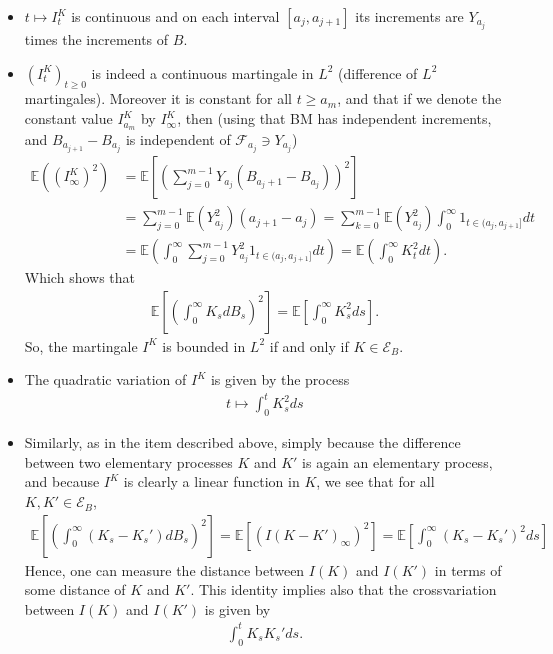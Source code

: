 \documentclass[../mainfile.tex]{subfiles}
\begin{document}
\begin{itemize}
\item $t \mapsto I_t^K$ is continuous and on each interval $[a_j, a_{j+1}]$ its increments are $Y_{a_j}$ times the increments of $B$. 
\item  $(I_t^K)_{t \geq 0}$ is indeed a continuous martingale in $L^2$ (difference of $L^2$ martingales). Moreover it is constant for all $t \geq a_m$, and that if we denote the constant value $I_{a_m}^K$ by $I_\infty^K$, then (using that BM has independent increments, and $B_{a_{j+1}}-B_{a_j}$ is independent of $\mathcal{F}_{a_j} \ni Y_{a_j}$)
\begin{align*}
\mathbb{E}((I_\infty^K)^2) & = \mathbb{E} \left[ \left( \sum_{j=0}^{m-1} Y_{a_j}(B_{a_j+1}-B_{a_j})\right)^2 \right]\\ &= \sum_{j=0}^{m-1} \mathbb{E}(Y_{a_j}^2)(a_{j+1}-a_j) = \sum_{k=0}^{m-1} \mathbb{E}(Y_{a_j}^2) \int_0^\infty 1_{t \in (a_j,a_{j+1}]} dt \\ &= \mathbb{E}\left( \int_0^\infty \sum_{j=0}^{m-1} Y_{a_j}^2 1 _{t \in (a_j,a_{j+1}]}dt\right) = \mathbb{E} \left( \int_0^\infty  K_t^2 dt\right).
\end{align*}
Which shows that
\begin{align*}
\mathbb{E} \left[ \left( \int_0^\infty K_sd B_s \right)^2 \right] = \mathbb{E}\left[ \int_0^\infty K_s^2 ds \right].
\end{align*}
So, the martingale $I^K$ is bounded in $L^2$ if and only if $K \in \mathcal{E}_B$. 
\item The quadratic variation  of $I^K$ is given by the process 
\begin{align*}
t \mapsto \int_0^t K_s^2 ds
\end{align*}
\item Similarly, as in the item described above, simply because the difference between two elementary processes $K$ and $K'$ is again an elementary process, and because $I^K$ is clearly a linear function in $K$,  we see that for all $K,K' \in \mathcal{E}_B$,  
\begin{align*}
\mathbb{E}\left[ \left( \int_0^\infty (K_s-K_s')dB_s\right)^2 \right] = \mathbb{E}[(I(K-K')_\infty)^2] = \mathbb{E} \left[ \int_0^\infty (K_s-K_s')^2ds \right]
\end{align*}
Hence, one can measure the distance between $I(K)$ and $I(K')$ in terms of some distance of $K$ and $K'$. This identity implies also that the crossvariation between $I(K)$ and $I(K')$ is given by 
\begin{align*}
\int_0^t K_sK_s'ds. 
\end{align*}
\end{itemize}
\newpage
\end{document}
